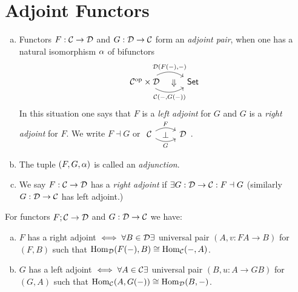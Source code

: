 \documentclass[a4paper]{report}
\begin{document}
\section{Adjoint Functors}
\begin{defi}
\begin{enumerate}[(a)]
  \item Functors $F: \mathcal{C} \to \mathcal{D}$ and $G: \mathcal{D} \to \mathcal{C}$ form an \emph{adjoint pair}, when one has a natural isomorphism $\alpha$ of bifunctors
        \[\begin{tikzcd}
{\C\op \tm \D} \arrow[r, "\!\!\!\!\!\!\!\!\!\!\!\!\!\!\!\!\! {\D(F(-),-)}", bend left] \arrow[r, "{\C(-,G(-))}"', bend right] \arrow[r, "\vimp", phantom] & \Set
\end{tikzcd}\]
        In this situation one says that $F$ is a \emph{left adjoint} for $G$ and $G$ is a \emph{right adjoint} for $F$. We write $F \dashv G$ or $\begin{tikzcd}
\cal C \arrow[r, "F", bend left] \arrow[r, "G"', bend right] \arrow[r, "\perp", phantom] & \cal D
\end{tikzcd}$.
  \item The tuple $(F,G,\alpha)$ is called an \emph{adjunction}.
        \item We say $F: \mathcal{C} \to \mathcal{D}$ has a \emph{right adjoint} if $\exists G: \mathcal{D} \to \mathcal{C}: F \dashv G$ (similarly $G: \mathcal{D} \to \mathcal{C}$ has left adjoint.)
\end{enumerate}
\end{defi}

\begin{thm}
  For functors $F; \mathcal{C} \to \mathcal{D}$ and $G: \mathcal{D} \to \mathcal{C}$ we have:
  \begin{enumerate}[(a)]
    \item $F$ has a right adjoint $\iff \forall B \in \mathcal{D} \exists$ universal pair $(A, v: FA \to B)$ for $(F, B)$ such that $\operatorname{Hom}_{\mathcal{D}}(F(-),B) \cong \operatorname{Hom}_{\mathcal{C}}(-,A)$.
          \item $G$ has a left adjoint $\iff \forall A \in \mathcal{C} \exists$ universal pair $(B, u: A \to GB)$ for $(G,A)$ such that $\operatorname{Hom}_{\mathcal{C}}(A, G(-)) \cong \operatorname{Hom}_{\mathcal{D}}(B,-)$.
  \end{enumerate}


\end{thm}
\end{document}
